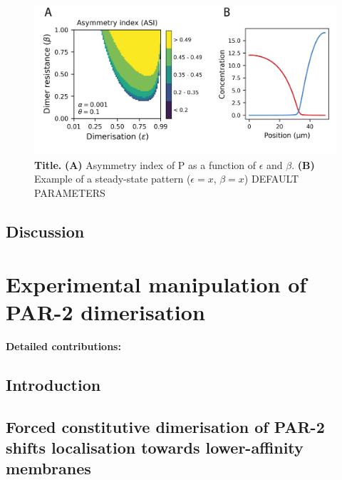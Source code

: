 \documentclass[12pt]{"report"}
\newcommand{\mycaption}[2]{\caption[#1]{\textbf{#1.} #2}}
\begin{document}

\begin{figure}
\includegraphics[scale=1]{dimer_mutual_antagonism_model_asi}
\centering
\mycaption{Title}{
\textbf{(A)} Asymmetry index of P as a function of $\epsilon$ and $\beta$.
\textbf{(B)} Example of a steady-state pattern ($\epsilon = x$, $\beta = x$)
DEFAULT PARAMETERS
}
\label{fig:dimer_mutual_antagonism_model_asi}
\end{figure}

\clearpage
\section{Discussion}

\clearpage
\chapter{Experimental manipulation of PAR-2 dimerisation}

\textbf{Detailed contributions:}\\

\clearpage
\section{Introduction}

\section{Forced constitutive dimerisation of PAR-2 shifts localisation towards lower-affinity membranes}

\end{document}
